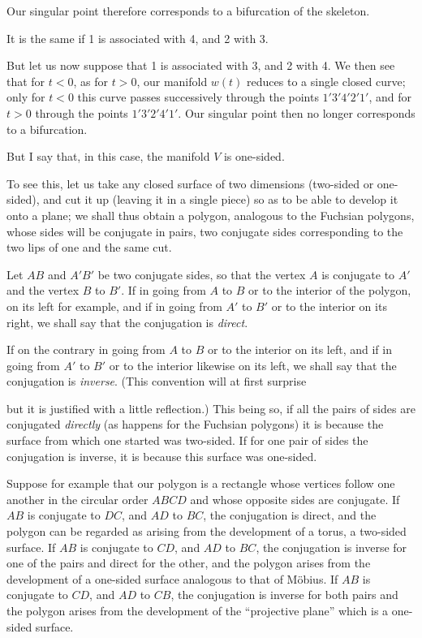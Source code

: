 \documentclass{article}
\begin{document}
Our singular point therefore corresponds to a bifurcation of the skeleton.

It is the same if 1 is associated with 4, and 2 with 3.

But let us now suppose that 1 is associated with 3, and 2 with 4. We then see that for $t < 0$, as for $t > 0$, our manifold $w(t)$ reduces to a single closed curve; only for $t < 0$ this curve passes successively through the points $1'3'4'2'1'$, and for $t > 0$ through the points $1'3'2'4'1'$. Our singular point then no longer corresponds to a bifurcation.

But I say that, in this case, the manifold $V$ is one-sided.

To see this, let us take any closed surface of two dimensions (two-sided or one-sided), and cut it up (leaving it in a single piece) so as to be able to develop it onto a plane; we shall thus obtain a polygon, analogous to the Fuchsian polygons, whose sides will be conjugate in pairs, two conjugate sides corresponding to the two lips of one and the same cut.

Let $AB$ and $A'B'$ be two conjugate sides, so that the vertex $A$ is conjugate to $A'$ and the vertex $B$ to $B'$. If in going from $A$ to $B$ or to the interior of the polygon, on its left for example, and if in going from $A'$ to $B'$ or to the interior on its right, we shall say that the conjugation is \emph{direct}.

If on the contrary in going from $A$ to $B$ or to the interior on its left, and if in going from $A'$ to $B'$ or to the interior likewise on its left, we shall say that the conjugation is \emph{inverse}. (This convention will at first surprise

but it is justified with a little reflection.) This being so, if all the pairs of sides are conjugated \emph{directly} (as happens for the Fuchsian polygons) it is because the surface from which one started was two-sided. If for one pair of sides the conjugation is inverse, it is because this surface was one-sided.

Suppose for example that our polygon is a rectangle whose vertices follow one another in the circular order $ABCD$ and whose opposite sides are conjugate. If $AB$ is conjugate to $DC$, and $AD$ to $BC$, the conjugation is direct, and the polygon can be regarded as arising from the development of a torus, a two-sided surface. If $AB$ is conjugate to $CD$, and $AD$ to $BC$, the conjugation is inverse for one of the pairs and direct for the other, and the polygon arises from the development of a one-sided surface analogous to that of Möbius. If $AB$ is conjugate to $CD$, and $AD$ to $CB$, the conjugation is inverse for both pairs and the polygon arises from the development of the ``projective plane'' which is a one-sided surface.
\end{document}
